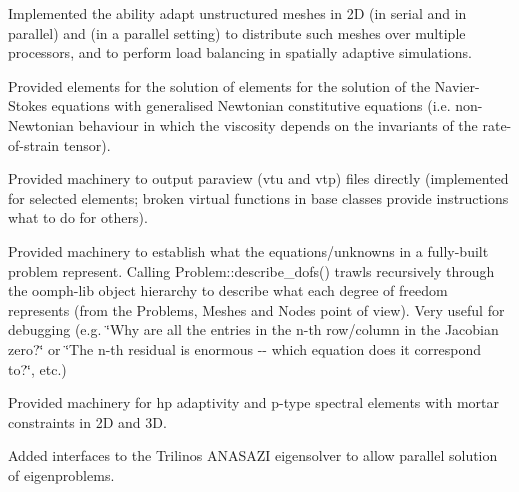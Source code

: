 \begin{DoxyItemize}
\item Implemented the ability adapt unstructured meshes in 2D (in serial and in parallel) and (in a parallel setting) to distribute such meshes over multiple processors, and to perform load balancing in spatially adaptive simulations. ~\newline
~\newline

\item Provided elements for the solution of elements for the solution of the Navier-\/\+Stokes equations with generalised Newtonian constitutive equations (i.\+e. non-\/\+Newtonian behaviour in which the viscosity depends on the invariants of the rate-\/of-\/strain tensor).~\newline
~\newline

\item Provided machinery to output paraview (vtu and vtp) files directly (implemented for selected elements; broken virtual functions in base classes provide instructions what to do for others). ~\newline
~\newline

\item Provided machinery to establish what the equations/unknowns in a fully-\/built problem represent. Calling {\ttfamily Problem\+::describe\+\_\+dofs()} trawls recursively through the oomph-\/lib object hierarchy to describe what each degree of freedom represents (from the Problem\textquotesingle{}s, Meshes\textquotesingle{} and Nodes\textquotesingle{} point of view). Very useful for debugging (e.\+g. \char`\"{}\+Why are all the entries in the n-\/th row/column in the Jacobian 
   zero?\char`\"{} or \char`\"{}\+The n-\/th residual is enormous -\/-\/ which equation does it
   correspond to?\char`\"{}, etc.) ~\newline
~\newline

\item Provided machinery for hp adaptivity and p-\/type spectral elements with mortar constraints in 2D and 3D.~\newline
~\newline

\item Added interfaces to the Trilinos A\+N\+A\+S\+A\+ZI eigensolver to allow parallel solution of eigenproblems. ~\newline
~\newline


\end{DoxyItemize}
